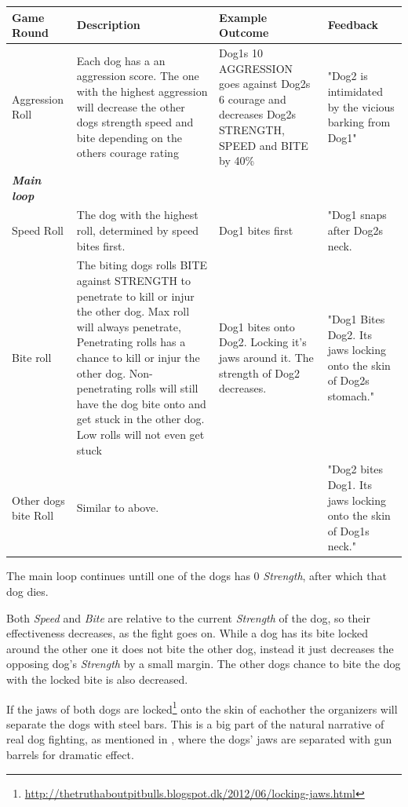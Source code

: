 \begin{center}
\scriptsize 
	\begin{tabular}{|l|p{5cm}|p{3cm}|p{3cm}|} 
		\hline
		\textbf{Game Round} & \textbf{Description} & \textbf{Example Outcome} &\textbf{ Feedback }\\ [0.5ex] 
		\hline\hline
		Aggression Roll & Each dog has a an aggression score. The one with the highest aggression will decrease the other dogs strength speed and bite depending on the others courage rating & Dog1s 10 AGGRESSION goes against Dog2s 6 courage and decreases Dog2s STRENGTH, SPEED and BITE by 40\% & "Dog2 is intimidated by the vicious barking from Dog1" \\  
		\hline\hline
		\textit{\textbf{Main loop}} \\
		\hline
		Speed Roll	& The dog with the highest roll, determined by speed bites first. &	Dog1 bites first & "Dog1 snaps after Dog2s neck. \\
		\hline
		Bite roll & The biting dogs rolls BITE against STRENGTH to penetrate to kill or injur the other dog. Max roll will always penetrate, Penetrating rolls has a chance to kill or injur the other dog. Non-penetrating rolls will still have the dog bite onto and get stuck in the other dog. Low rolls will not even get stuck & Dog1 bites onto Dog2. Locking it's jaws around it. The strength of Dog2 decreases.	& "Dog1 Bites Dog2. Its jaws locking onto the skin of Dog2s stomach." \\
		\hline
		Other dogs bite Roll & Similar to above. & & "Dog2 bites Dog1. Its jaws locking onto the skin of Dog1s neck." \\
		\hline
	\end{tabular}
\end{center}


The main loop continues untill one of the dogs has 0 \textit{Strength}, after which that dog dies.\

Both \textit{Speed} and \textit{Bite} are relative to the current \textit{Strength} of the dog, so their effectiveness decreases, as the fight goes on. While a dog has its bite locked around the other one it does not bite the other dog, instead it just decreases the opposing dog's \textit{Strength} by a small margin. The other dogs chance to bite the dog with the locked bite is also decreased.\

If the jaws of both dogs are locked\footnote{\url{http://thetruthaboutpitbulls.blogspot.dk/2012/06/locking-jaws.html}} onto the skin of eachother the organizers will separate the dogs with steel bars. This is a big part of the natural narrative of real dog fighting, as mentioned in \citep{london1997call}, where the dogs' jaws are separated with gun barrels for dramatic effect.\

